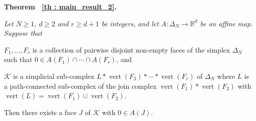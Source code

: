 \documentclass[a4paper,11pt,reqno, english]{amsart}
\theoremstyle{definition}
\theoremstyle{remark}
\newcommand\R{\mathbb R}
\DeclareMathOperator{\vertex}{\mathrm{vert}}
\begin{document}
\medskip\noindent
{\bf Theorem ~\ref{th : main_result_2}.}
{\em
	Let $N\geq 1$, $d\geq 2$ and $r\geq d+1$ be integers, and let $A\colon \Delta_N\longrightarrow\R^d$ be an affine map.
	Suppose that
	\begin{compactenum}[\rm (1)]
		\item $F_1,\dots, F_{r}$ is a collection of pairwise disjoint non-empty faces of the simplex $\Delta_N$ such that
		$
			0\in A(F_1)\cap\cdots\cap A(F_r)
		$, and
		\item $\mathcal{K}$ is a simplicial sub-complex  $L*\vertex(F_3)*\cdots * \vertex(F_r)$ of $\Delta_N$ where $L$ is a path-connected sub-complex of the join complex $\vertex(F_1)*\vertex(F_2)$ with $\vertex(L)=\vertex(F_1)\cup\vertex(F_2)$.
	\end{compactenum}
	Then there exists a face $J$ of $\mathcal{K}$ with $0\in A(J)$.}
\end{document}
